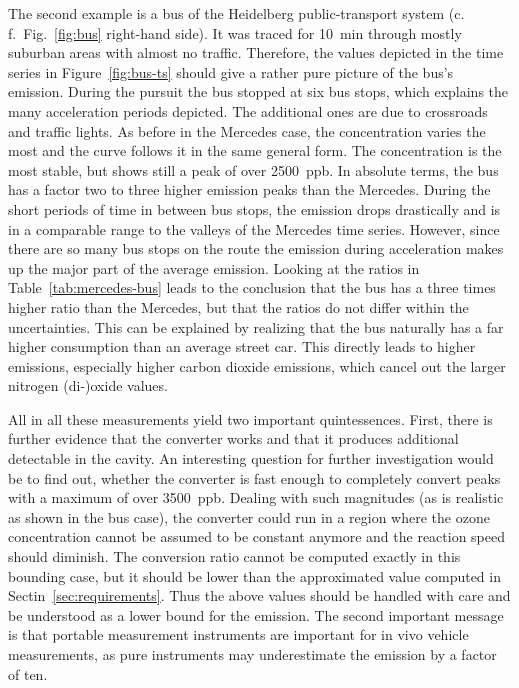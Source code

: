 The second example is a bus of the Heidelberg public-transport system
(c.\,f.\ Fig.~\ref{fig:bus} right-hand side). It was traced for
\SI{10}{\minute} through mostly suburban areas with almost no
traffic. Therefore, the values depicted in the time series in
Figure~\ref{fig:bus-ts} should give a rather pure picture of the bus's
emission. During the pursuit the bus stopped at six bus stops, which
explains the many acceleration periods depicted. The additional ones
are due to crossroads and traffic lights. As before in the Mercedes
case, the  concentration varies the most and the 
curve follows it in the same general form. The  concentration
is the most stable, but shows still a peak of over \SI{2500}{ppb}. In
absolute terms, the bus has a factor two to three higher 
emission peaks than the Mercedes. During the short periods of time in
between bus stops, the emission drops drastically and is in a
comparable range to the valleys of the Mercedes time series. However,
since there are so many bus stops on the route the emission during
acceleration makes up the major part of the average emission. Looking
at the ratios in Table~\ref{tab:mercedes-bus} leads to the conclusion
that the bus has a three times higher  ratio than the
Mercedes, but that the  ratios do not differ within the
uncertainties. This can be explained by realizing that the bus
naturally has a far higher consumption than an average street
car. This directly leads to higher emissions, especially higher
carbon dioxide emissions, which cancel out the larger nitrogen (di-)oxide
values.

All in all these measurements yield two important
quintessences. First, there is further evidence that the converter
works and that it produces additional detectable  in the
cavity. An interesting question for further investigation would be to
find out, whether the converter is fast enough to completely convert
 peaks with a maximum of over \SI{3500}{ppb}. Dealing with
such magnitudes (as is realistic as shown in the bus case), the
converter could run in a region where the ozone concentration cannot
be assumed to be constant anymore and the reaction speed should
diminish. The conversion ratio cannot be computed exactly in this
bounding case, but it should be lower than the approximated value
computed in Sectin~\ref{sec:requirements}. Thus the above 
values should be handled with care and be understood as a lower bound
for the emission. The second important message is that portable
 measurement instruments are important for in vivo vehicle
measurements, as pure  instruments may underestimate the
 emission by a factor of ten.

